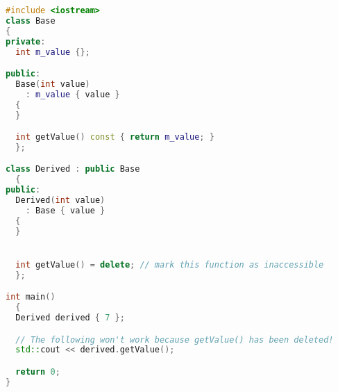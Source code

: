 \documentclass[../../LearnCpp.tex]{subfiles}
\begin{document}
\begin{lstlisting}[language=C++]
#include <iostream>
class Base
{
private:
  int m_value {};

public:
  Base(int value)
    : m_value { value }
  {
  }

  int getValue() const { return m_value; }
  };

class Derived : public Base
  {
public:
  Derived(int value)
    : Base { value }
  {
  }


  int getValue() = delete; // mark this function as inaccessible
  };

int main()
  {
  Derived derived { 7 };

  // The following won't work because getValue() has been deleted!
  std::cout << derived.getValue();

  return 0;
}
\end{lstlisting}
\end{document}

